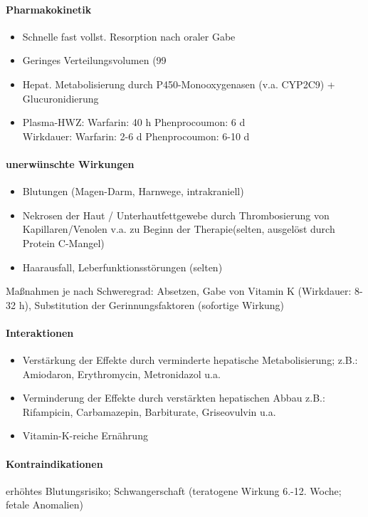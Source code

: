 \documentclass[10pt,a4paper]{report}
\begin{document}
\paragraph{Pharmakokinetik} %
\label{par:pharmakokinetik}
\begin{itemize}
	\item Schnelle fast vollst. Resorption nach oraler Gabe
	\item Geringes Verteilungsvolumen (99 %
	\item Hepat. Metabolisierung durch P450-Monooxygenasen (v.a. CYP2C9) + Glucuronidierung
	\item Plasma-HWZ: 	Warfarin: 40 h 	Phenprocoumon: 6 d \\Wirkdauer:		Warfarin: 2-6 d 	Phenprocoumon: 6-10 d
\end{itemize}
\paragraph{unerwünschte Wirkungen} %
\label{par:unerw_nschte_wirkungen}
\begin{itemize}
	\item Blutungen (Magen-Darm, Harnwege, intrakraniell)
	\item Nekrosen der Haut / Unterhautfettgewebe durch Thrombosierung von Kapillaren/Venolen v.a. zu Beginn der Therapie(selten, ausgelöst durch Protein C-Mangel)
	\item Haarausfall, Leberfunktionsstörungen (selten)
\end{itemize}
Maßnahmen je nach Schweregrad: Absetzen, Gabe von Vitamin K (Wirkdauer: 8-32 h), Substitution der Gerinnungsfaktoren (sofortige Wirkung)
\paragraph{Interaktionen} %
\label{par:interaktionen}
\begin{itemize}
	\item Verstärkung der Effekte durch verminderte hepatische 
	Metabolisierung; z.B.: Amiodaron, Erythromycin, Metronidazol u.a.
	\item Verminderung der Effekte durch verstärkten hepatischen Abbau
	z.B.: Rifampicin, Carbamazepin, Barbiturate, Griseovulvin u.a.
	\item Vitamin-K-reiche Ernährung
\end{itemize}
\paragraph{Kontraindikationen} %
\label{par:kontraindikationen}
erhöhtes Blutungsrisiko; Schwangerschaft (teratogene Wirkung 6.-12. Woche; fetale Anomalien)
\end{document}
